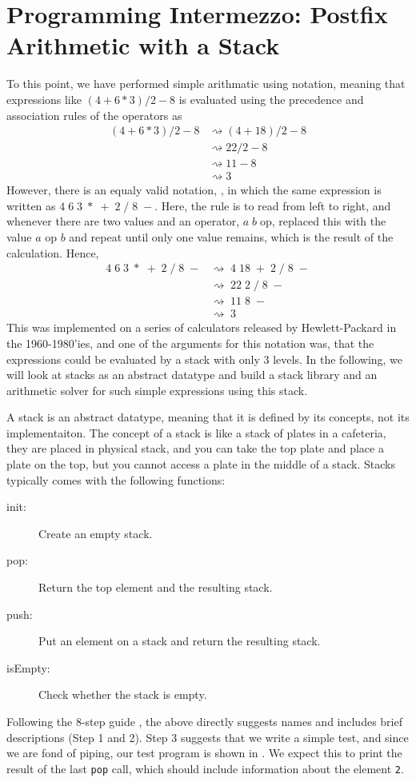 \documentclass[fsharpNotes.tex]{subfiles}
\begin{document}
\section{Programming Intermezzo: Postfix Arithmetic with a Stack}
To this point, we have performed simple arithmatic using  notation, meaning that expressions like $(4+6*3)/2-8$ is evaluated using the precedence and association rules of the operators as
\begin{align}
  (4+6*3)/2-8
  &\rightsquigarrow (4+18)/2-8\\
  &\rightsquigarrow 22/2-8\\
  &\rightsquigarrow 11-8\\
  &\rightsquigarrow 3
\end{align}
However, there is an equaly valid notation, , in which the same expression is written as $4\; 6\; 3\; *\; +\; 2\; /\; 8\; -$. Here, the rule is to read from left to right, and whenever there are two values and an operator, $a\; b\; \text{op}$, replaced this with the value $a \text{ op } b$ and repeat until only one value remains, which is the result of the calculation. Hence,
\begin{align}
  4\; 6\; 3\; *\; +\; 2\; /\; 8\; -
  &\rightsquigarrow\; 4\; 18\; +\; 2\; /\; 8\; -\\
  &\rightsquigarrow\; 22\; 2\; /\; 8\; -\\
  &\rightsquigarrow\; 11\; 8\; -\\
  &\rightsquigarrow\; 3
\end{align}
This was implemented on a series of calculators released by Hewlett-Packard in the 1960-1980'ies, and one of the arguments for this notation was, that the expressions could be evaluated by a stack with only 3 levels. In the following, we will look at stacks as an abstract datatype and build a stack library and an arithmetic solver for such simple expressions using this stack.

A stack is an abstract datatype, meaning that it is defined by its concepts, not its implementaiton. The concept of a stack is like a stack of plates in a cafeteria, they are placed in physical stack, and you can take the top plate and place a plate on the top, but you cannot access a plate in the middle of a stack. Stacks typically comes with the following functions:
\begin{description}
\item[init:] Create an empty stack.
\item[pop:] Return the top element and the resulting stack.
\item[push:] Put an element on a stack and return the resulting stack.
\item[isEmpty:] Check whether the stack is empty.
\end{description}
Following the 8-step guide , the above directly suggests names and includes brief descriptions (Step 1 and 2). Step 3 suggests that we write a simple test, and
since we are fond of piping, our test program is shown in .
We expect this to print the result of the last \lstinline{pop} call, which should include information about the element \lstinline{2}.
\end{document}
